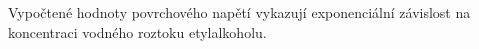 \documentclass[protokol.tex]{subfiles}
\begin{document}
Vypočtené hodnoty povrchového napětí vykazují exponenciální závislost na koncentraci vodného roztoku etylalkoholu.
\end{document}
